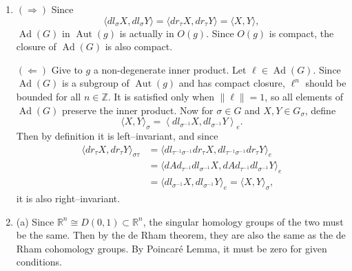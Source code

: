 \begin{enumerate}
And if we integrate with respect to $\mu^{\prime}$ first, we get $\int_{G} f \omega^{\prime}$. 
By Fubini's theorem, they must be the same. Also,
\[\int_{G} \omega^{\prime}=\int_{G} \delta \alpha(\omega)=\int_{\alpha(G)} \omega=1,\]
so $\int_{G} f \omega=\int_{G} f \omega^{\prime}$. 
Since $\int_{G} f \omega^{\prime}=\int_{\alpha(G)}(f \circ \alpha) \omega$, the result follows.
\item $(\Rightarrow)$ Since
\[\langle d l_{\sigma} X, d l_{\sigma} Y\rangle
=\langle d r_{\tau} X, d r_{\tau} Y\rangle=\langle X, Y\rangle,\]
$\operatorname{Ad}(G)$ in $\operatorname{Aut}(g)$ is actually in $O(g)$. 
Since $O(g)$ is compact, the closure of $\operatorname{Ad}(G)$ is also compact.

$(\Leftarrow)$ Give to $g$ a non-degenerate inner product. Let $\ell \in \operatorname{Ad}(G)$. 
Since $\operatorname{Ad}(G)$ is a subgroup of $\operatorname{Aut}(g)$ and has compact closure, 
$\ell^{n}$ should be bounded for all $n \in \mathbb{Z}$. 
It is satisfied only when $\|\ell\|=1$, so all elements of $\operatorname{Ad}(G)$ preserve the inner product. 
Now for $\sigma \in G$ and $X, Y \in G_{\sigma}$, define
\[\langle X, Y\rangle_{\sigma}=\left\langle d l_{\sigma^{-1}} X, d l_{\sigma^{-1}} Y\right\rangle_{e}.\]
Then by definition it is left--invariant, and since
\begin{align*}
\langle d r_{\tau} X, d r_{\tau} Y\rangle_{\sigma \tau}
&=\langle d l_{\tau^{-1} \sigma^{-1}} d r_{\tau} X, d l_{\tau^{-1} \sigma^{-1}} d r_{\tau} Y\rangle_{e}\\
&=\langle d A d_{\tau^{-1}} d l_{\sigma^{-1}} X, d A d_{\tau^{-1}} d l_{\sigma^{-1}} Y\rangle_{e}\\
&=\langle d l_{\sigma^{-1}} X, d l_{\sigma^{-1}} Y\rangle_{e}=\langle X, Y\rangle_{\sigma},
\end{align*}
it is also right--invariant.
\item (a) Since $\mathbb{R}^{n} \cong D(0,1) \subset \mathbb{R}^{n}$, 
the singular homology groups of the two must be the same. 
Then by the de Rham theorem, they are also the same as the de Rham cohomology groups. 
By Poincaré Lemma, it must be zero for given conditions.


\end{enumerate}
